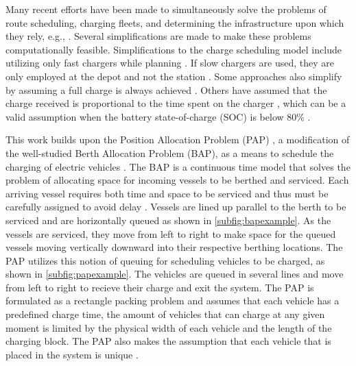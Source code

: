 \documentclass[ee,thesis]{usuthesis}
\begin{document}
Many recent efforts have been made to simultaneously solve the problems of route scheduling, charging fleets, and
determining the infrastructure upon which they rely, e.g., \cite{wei-2018-optim-spatio,sebastiani-2016-evaluat-elect,hoke-2014-accoun-lithium,wang-2017-elect-vehic}. Several simplifications are made to make these problems
computationally feasible. Simplifications to the charge scheduling model include utilizing only fast chargers while
planning \cite{wei-2018-optim-spatio,sebastiani-2016-evaluat-elect,wang-2017-optim-rechar,zhou-2020-bi-objec,yang-2018-charg-sched,wang-2017-elect-vehic,qin-2016-numer-analy,liu-2020-batter-elect}. If slow chargers are used,
they are only employed at the depot and not the station \cite{he-2020-optim-charg,tang-2019-robus-sched}. Some
approaches also simplify by assuming a full charge is always achieved
\cite{wei-2018-optim-spatio,wang-2017-elect-vehic,zhou-2020-bi-objec,wang-2017-optim-rechar}. Others have assumed
that the charge received is proportional to the time spent on the charger
\cite{liu-2020-batter-elect,yang-2018-charg-sched}, which can be a valid assumption when the battery state-of-charge
(SOC) is below 80\% \cite{liu-2020-batter-elect}.

This work builds upon the Position Allocation Problem (PAP) \cite{qarebagh-2019-optim-sched}, a modification of the
well-studied Berth Allocation Problem (BAP), as a means to schedule the charging of electric vehicles
\cite{buhrkal-2011-model-discr,frojan-2015-contin-berth,imai-2001-dynam-berth}. The BAP is a continuous time model
that solves the problem of allocating space for incoming vessels to be berthed and serviced. Each arriving vessel
requires both time and space to be serviced and thus must be carefully assigned to avoid delay
\cite{imai-2001-dynam-berth}. Vessels are lined up parallel to the berth to be serviced and are horizontally queued as
shown in \autoref{subfig:bapexample}. As the vessels are serviced, they move from left to right to make space for the
queued vessels moving vertically downward into their respective berthing locations. The PAP utilizes this notion of
queuing for scheduling vehicles to be charged, as shown in \autoref{subfig:papexample}. The vehicles are queued in
several lines and move from left to right to recieve their charge and exit the system. The PAP is formulated as a
rectangle packing problem and assumes that each vehicle has a predefined charge time, the amount of vehicles that can
charge at any given moment is limited by the physical width of each vehicle and the length of the charging block. The
PAP also makes the assumption that each vehicle that is placed in the system is unique
\cite{qarebagh-2019-optim-sched}.
\end{document}
